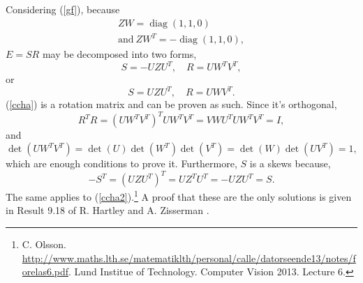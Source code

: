 Considering (\ref{gf}), because
\begin{equation}
\begin{aligned} 
Z W = \operatorname { diag } ( 1,1,0 ) \\ 
\text{and} \
Z W ^ { T } = - \operatorname { diag } ( 1,1,0 ) ,
\end{aligned}
\end{equation}
$E=SR$ may be decomposed into two forms,
\begin{equation}
\label{ccha}
S = - U Z U ^ { T } , \quad R = U W ^ { T } V ^ { T },
\end{equation}
or
\begin{equation}
\label{ccha2}
S = U Z U ^ { T } , \quad R = U W V ^ { T }.
\end{equation}
(\ref{ccha}) is a rotation matrix and can be proven as such. Since it's orthogonal,
\begin{equation}
R ^ { T } R = \left( U W ^ { T } V ^ { T } \right) ^ { T } U W ^ { T } V ^ { T } = V W U ^ { T } U W ^ { T } V ^ { T } = I,
\end{equation}
and 
\begin{equation}
\operatorname { det } \left( U W ^ { T } V ^ { T } \right) = \operatorname { det } ( U ) \operatorname { det } \left( W ^ { T } \right) \operatorname { det } \left( V ^ { T } \right) = \operatorname { det } ( W ) \operatorname { det } \left( U V ^ { T } \right) = 1,
\end{equation}
which are enough conditions to prove it. Furthermore, $S$ is a \gls{skews} because,
\begin{equation}
- S^ { T } = \left( U Z U ^ { T } \right) ^ { T } = U Z ^ { T } U ^ { T } = - U Z U ^ { T } = S.
\end{equation}
The same applies to (\ref{ccha2}).\footnote{C. Olsson. \href{http://www.maths.lth.se/matematiklth/personal/calle/datorseende13/notes/forelas6.pdf}{http://www.maths.lth.se/matematiklth/personal/calle/datorseende13/notes/forelas6.pdf}. Lund Institue of Technology. Computer Vision 2013. Lecture 6.} A proof that these are the only solutions is given in Result 9.18 of R. Hartley and A. Zisserman \cite{multiview}.

